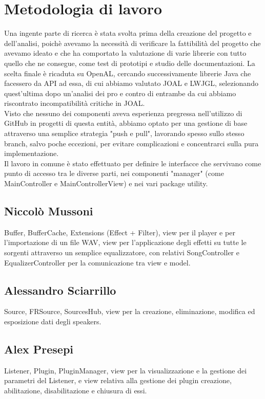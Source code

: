 \documentclass[a4paper,12pt]{report}
\begin{document}
\section{Metodologia di lavoro}
Una ingente parte di ricerca è stata svolta prima della creazione del progetto e dell'analisi, poichè avevamo la necessità di verificare la fattibilità del progetto che avevamo ideato e che ha comportato la valutazione di varie librerie con tutto quello che ne consegue, come test di prototipi e studio delle documentazioni. La scelta finale è ricaduta su OpenAL, cercando successivamente librerie Java che facessero da API ad essa, di cui abbiamo valutato JOAL e LWJGL, selezionando quest'ultima dopo un'analisi dei pro e contro di entrambe da cui abbiamo riscontrato incompatibilità critiche in JOAL.
\\Visto che nessuno dei componenti aveva esperienza pregressa nell'utilizzo di GitHub in progetti di questa entità, abbiamo optato per una gestione di base attraverso una semplice strategia "push e pull", lavorando spesso sullo stesso branch, salvo poche eccezioni, per evitare complicazioni e concentrarci sulla pura implementazione.
\\Il lavoro in comune è stato effettuato per definire le interfacce che servivano come punto di accesso tra le diverse parti, nei componenti "manager" (come MainController e MainControllerView) e nei vari package utility.
\subsection*{Niccolò Mussoni}
Buffer, BufferCache,  Extensions (Effect + Filter), view per il player e per l’importazione di un file WAV, view per l’applicazione degli effetti su tutte le sorgenti attraverso un semplice equalizzatore, con relativi SongController e EqualizerController per la comunicazione tra view e model.
\subsection*{Alessandro Sciarrillo}
 Source, FRSource, SourcesHub, view per la creazione, eliminazione, modifica ed esposizione dati degli speakers.
\subsection*{Alex Presepi}
Listener, Plugin, PluginManager, view per la visualizzazione e la gestione dei parametri del Listener, e view relativa alla gestione dei plugin creazione, abilitazione, disabilitazione e chiusura di essi.
\end{document}
